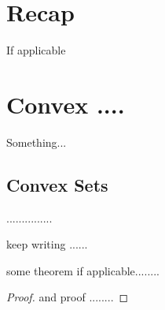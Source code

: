 \documentclass[12pt]{report}
\begin{document}

\maketitle


%

\section{Recap}
If applicable

\section{Convex ....}
Something...
\subsection{Convex Sets}
\begin{definition}
...............
\end{definition}


keep writing ......
\begin{theorem}
some theorem if applicable........
\end{theorem}

\begin{proof}
and proof ........
\end{proof}
\end{document}

